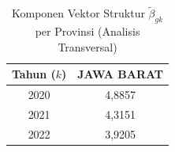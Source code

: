 \begin{table}[H]
\centering
\small
\caption{Komponen Vektor Struktur $\tilde{\beta}_{gk}$ per Provinsi (Analisis Transversal)} \label{tab:sample2beta_provinsi}
\begin{tabular}{|c|c|}
\hline
\textbf{Tahun ($k$)} & \textbf{JAWA BARAT} \\
\hline
2020 & 4,8857 \\
2021 & 4,3151 \\
2022 & 3,9205 \\
\hline
\end{tabular}
\end{table}